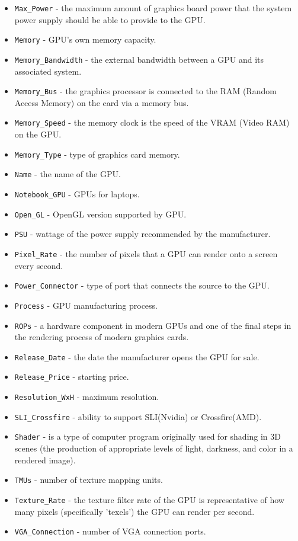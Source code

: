 \documentclass[a4paper]{article}
\begin{document}
\begin{itemize}
    \item \verb|Max_Power| - the maximum amount of graphics board power that the system power supply should be able to provide to the GPU.
    \item \verb|Memory| - GPU's own memory capacity.
    \item \verb|Memory_Bandwidth| - the external bandwidth between a GPU and its associated system.
    \item \verb|Memory_Bus| - the graphics processor is connected to the RAM (Random Access Memory) on the card via a memory bus.
    \item \verb|Memory_Speed| - the memory clock is the speed of the VRAM (Video RAM) on the GPU.
    \item \verb|Memory_Type| - type of graphics card memory.
    \item \verb|Name| - the name of the GPU.
    \item \verb|Notebook_GPU| - GPUs for laptops.
    \item \verb|Open_GL| - OpenGL version supported by GPU.
    \item \verb|PSU| - wattage of the power supply recommended by the manufacturer.
    \item \verb|Pixel_Rate| -  the number of pixels that a GPU can render onto a screen every second. 
    \item \verb|Power_Connector| - type of port that connects the source to the GPU.
    \item \verb|Process| - GPU manufacturing process.
    \item \verb|ROPs| - a hardware component in modern GPUs and one of the final steps in the rendering process of modern graphics cards.
    \item \verb|Release_Date| - the date the manufacturer opens the GPU for sale.
    \item \verb|Release_Price| - starting price.
    \item \verb|Resolution_WxH| - maximum resolution.
    \item \verb|SLI_Crossfire| - ability to support SLI(Nvidia) or Crossfire(AMD).
    \item \verb|Shader| - is a type of computer program originally used for shading in 3D scenes (the production of appropriate levels of light, darkness, and color in a rendered image).
    \item \verb|TMUs| - number of texture mapping units.
    \item \verb|Texture_Rate| - the texture filter rate of the GPU is representative of how many pixels (specifically 'texels') the GPU can render per second.
    \item \verb|VGA_Connection| - number of VGA connection ports.
\end{itemize}
\end{document}
